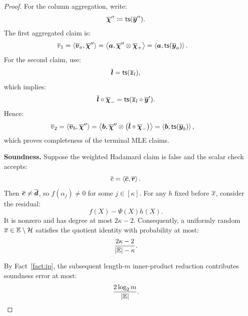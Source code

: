 \begin{proof}
For the column aggregation, write:
\[
    \overline{\bm\chi}''
    \coloneqq
    {\sf ts}(\overline{\bm y}'').
\]
The first aggregated claim is:
\[
\begin{aligned}
    \overline{v}_1
    &=
    \left\langle
        \overline{\bm v}_a,\overline{\bm\chi}''
    \right\rangle
    =
    \left\langle
        \bm a,
        \overline{\bm\chi}''
        \mathbin{\otimes}
        \overline{\bm\chi}_+
    \right\rangle
    =
    \left\langle
        \bm a,
        {\sf ts}(\overline{\bm y}_a)
    \right\rangle.
\end{aligned}
\]
For the second claim, use:
\[
    \overline{\bm l}
    =
    {\sf ts}(\overline{\bm z}_l),
\]
which implies:
\[
    \overline{\bm l}\circ\overline{\bm\chi}_-
    =
    {\sf ts}(
        \overline{\bm z}_l
        \circ
        \overline{\bm y}'
    ).
\]
Hence:
\[
\begin{aligned}
    \overline{v}_2
    &=
    \left\langle
        \overline{\bm v}_b,\overline{\bm\chi}''
    \right\rangle
    =
    \left\langle
        \bm b,
        \overline{\bm\chi}''
        \mathbin{\otimes}
        \left(
            \overline{\bm l}\circ\overline{\bm\chi}_-
        \right)
    \right\rangle
    =
    \left\langle
        \bm b,
        {\sf ts}(\overline{\bm y}_b)
    \right\rangle,
\end{aligned}
\]
which proves completeness of the terminal MLE claims.

\smallskip\noindent\textbf{Soundness.}
Suppose the weighted Hadamard claim is false and the scalar check
accepts:
\[
    \overline{c}
    =
    \left\langle
        \overline{\bm c},\overline{\bm r}
    \right\rangle.
\]
Then \(\overline{\bm c}\neq\overline{\bm d}\), so \(f(\alpha_j)\neq0\)
for some \(j\in[\kappa]\). For any \(h\) fixed before
\(\overline{x}\), consider the residual:
\[
    f(X)-\Psi(X)h(X).
\]
It is nonzero and has degree at most \(2\kappa-2\).
Consequently, a uniformly random
\(\overline{x}\in\mathbb{E}\setminus\mathcal H\) satisfies the
quotient identity with probability at most:
\[
    \frac{2\kappa-2}
         {|\mathbb{E}|-\kappa}.
\]

By Fact~\ref{fact:ip}, the subsequent length-\(m\)
inner-product reduction contributes soundness error at most:
\[
    \frac{2\log_2m}
         {|\mathbb{E}|}.
\]


\end{proof}
